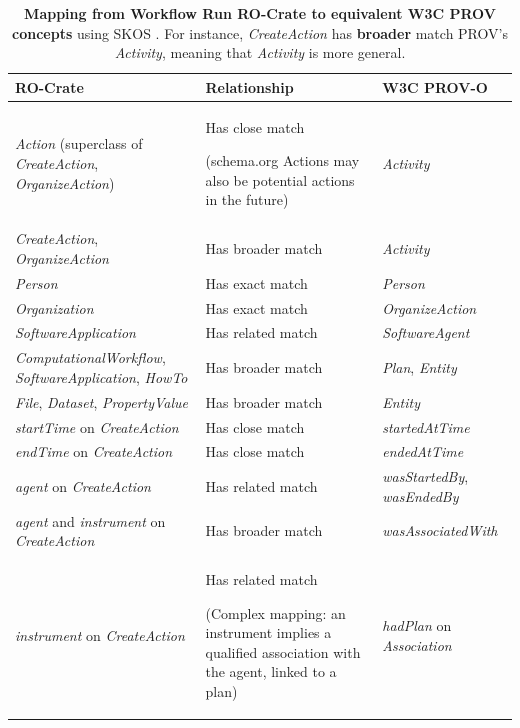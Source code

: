 \begin{table}[p]
  \centering
  \caption[Mapping from Workflow Run RO-Crate to equivalent W3C PROV concepts]{
  {\bf Mapping from Workflow Run RO-Crate to equivalent W3C PROV concepts} using SKOS \cite{Isaac 2009}. For instance, \emph{CreateAction} has \textbf{broader} match PROV's \emph{Activity}, meaning that \emph{Activity} is more general.}
  \begin{tabular}{p{40mm}|p{50mm}|p{40mm}}
  \hline
  {\bf RO-Crate} & \textbf{Relationship} & {\bf W3C PROV-O} \\
  \hline

  \emph{Action} (superclass of \emph{CreateAction}, \emph{OrganizeAction}) & 
    Has close match 
    \begin{small}
      (schema.org Actions may also be potential actions in the future)
    \end{small}
    & 
    \emph{Activity}
    \\ \hline
  \emph{CreateAction}, \emph{OrganizeAction} & 
    Has broader match & 
    \emph{Activity}
    \\ \hline
  \emph{Person} & 
    Has exact match & 
    \emph{Person}
    \\ \hline
  \emph{Organization} & 
    Has exact match & 
    \emph{OrganizeAction} 
    \\ \hline
  \emph{SoftwareApplication} & 
    Has related match & 
    \emph{SoftwareAgent}
    \\ \hline
  \emph{ComputationalWorkflow}, \emph{SoftwareApplication}, \emph{HowTo} & 
    Has broader match & 
    \emph{Plan},
    \emph{Entity}
    \\ \hline
  \emph{File}, \emph{Dataset}, \emph{PropertyValue} & 
    Has broader match & 
    \emph{Entity}
    \\ \hline
  \emph{startTime} on \emph{CreateAction} & 
    Has close match & 
    \emph{startedAtTime}
    \\ \hline
  \emph{endTime} on \emph{CreateAction} & 
    Has close match & 
    \emph{endedAtTime}
    \\ \hline
  \emph{agent} on \emph{CreateAction} & 
    Has related match & 
    \emph{wasStartedBy}, \emph{wasEndedBy}
    \\ \hline
  \emph{agent} and \emph{instrument} on \emph{CreateAction} & 
    Has broader match & 
    \emph{wasAssociatedWith}
    \\ \hline
  \emph{instrument} on \emph{CreateAction} & 
    Has related match 
    \begin{small}
      (Complex mapping: an instrument implies a qualified association with the agent, linked to a plan)
    \end{small}
    & 
    \emph{hadPlan} on \emph{Association}
    \\ \hline


\end{tabular}
\end{table}
